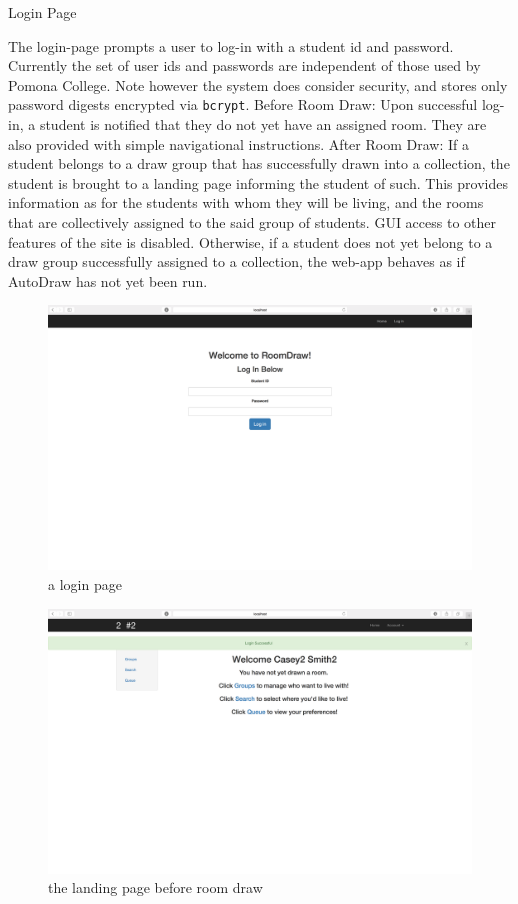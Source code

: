 \begin{outline}
\1 Login Page
  
  \2 The login-page prompts a user to log-in with a student id and password.
  Currently the set of user ids and passwords are independent of those used by
  Pomona College. Note however the system does consider security, and stores
  only password digests encrypted via \texttt{bcrypt}.
  \2 Before Room Draw:
    \3 Upon successful log-in, a student is notified that they do not yet have
    an assigned room. They are also provided with simple navigational
    instructions.
  \2 After Room Draw:
    \3 If a student belongs to a draw group that has successfully drawn into a
    collection, the student is brought to a landing page informing the student
    of such. This provides information as for the students with whom they will
    be living, and the rooms that are collectively assigned to the said group of
    students. GUI access to other features of the site is disabled.
    \3 Otherwise, if a student does not yet belong to a draw group successfully
    assigned to a collection, the web-app behaves as if AutoDraw has not yet been
    run.
    
\begin{figure}[H] \centering
\includegraphics[scale=.225]{screens/login}
\caption{a login page}
\label{fig:screenlogin}
\end{figure}

\begin{figure}[H] \centering
\includegraphics[scale=.225]{screens/landing_undrawn}
\caption{the landing page before room draw}
\label{fig:screenlandingundrawn}
\end{figure}


\end{outline}
